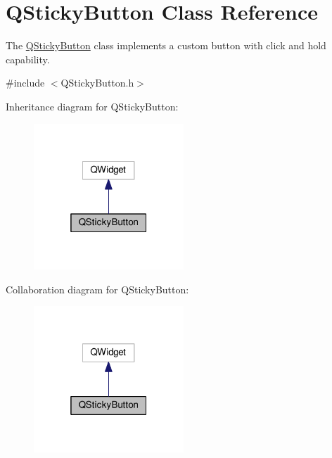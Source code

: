 \hypertarget{class_q_sticky_button}{\section{Q\-Sticky\-Button Class Reference}
\label{class_q_sticky_button}
}


The \hyperlink{class_q_sticky_button}{Q\-Sticky\-Button} class implements a custom button with click and hold capability.  




{\ttfamily \#include $<$Q\-Sticky\-Button.\-h$>$}



Inheritance diagram for Q\-Sticky\-Button\-:
\nopagebreak
\begin{figure}[H]
\begin{center}
\leavevmode
\includegraphics[width=160pt]{class_q_sticky_button__inherit__graph}
\end{center}
\end{figure}


Collaboration diagram for Q\-Sticky\-Button\-:
\nopagebreak
\begin{figure}[H]
\begin{center}
\leavevmode
\includegraphics[width=160pt]{class_q_sticky_button__coll__graph}
\end{center}
\end{figure}

